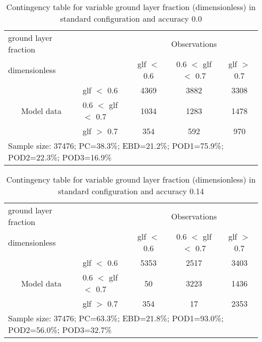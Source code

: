 \documentclass[11pt,english]{article}
\begin{document}
\newpage

\clearpage
\begin{table}[]
\begin{center}
\begin{tabular}{llccc}
\hline
{ground layer fraction}                                       &                                                    & \multicolumn{3}{c}{Observations}                 \\
{dimensionless}                                       &                             & glf $<$ 0.6   & 0.6 $<$ glf $<$ 0.7 & glf $>$ 0.7 \\
\hline
\multicolumn{1}{c}{\multirow{3}{*}{Model data}}  & glf $<$ 0.6             & 4369                & 3882                       & 3308              \\
                                                 & 0.6  $<$ glf $<$ 0.7 & 1034                & 1283                       & 1478              \\
                                                 & glf $>$ 0.7             & 354                & 592                       & 970              \\
\hline
\multicolumn{5}{l}{Sample size: 37476; PC=38.3\%; EBD=21.2\%; POD1=75.9\%; POD2=22.3\%; POD3=16.9\%}
\end{tabular}
\end{center}
\caption{Contingency table for variable ground layer fraction (dimensionless) in standard configuration and accuracy 0.0}
\label{tab:contingencyglfBEF}
\end{table}
\begin{table}[]
\begin{center}
\begin{tabular}{llccc}
\hline
{ground layer fraction}                                       &                                                    & \multicolumn{3}{c}{Observations}                 \\
{dimensionless}                                       &                             & glf $<$ 0.6   & 0.6 $<$ glf $<$ 0.7 & glf $>$ 0.7 \\
\hline
\multicolumn{1}{c}{\multirow{3}{*}{Model data}}  & glf $<$ 0.6             & 5353                & 2517                       & 3403              \\
                                                 & 0.6  $<$ glf $<$ 0.7 & 50                & 3223                       & 1436              \\
                                                 & glf $>$ 0.7             & 354                & 17                       & 2353              \\
\hline
\multicolumn{5}{l}{Sample size: 37476; PC=63.3\%; EBD=21.8\%; POD1=93.0\%; POD2=56.0\%; POD3=32.7\%}
\end{tabular}
\end{center}
\caption{Contingency table for variable ground layer fraction (dimensionless) in standard configuration and accuracy 0.14}
\label{tab:contingencyglfBEF}
\end{table}
\end{document}
